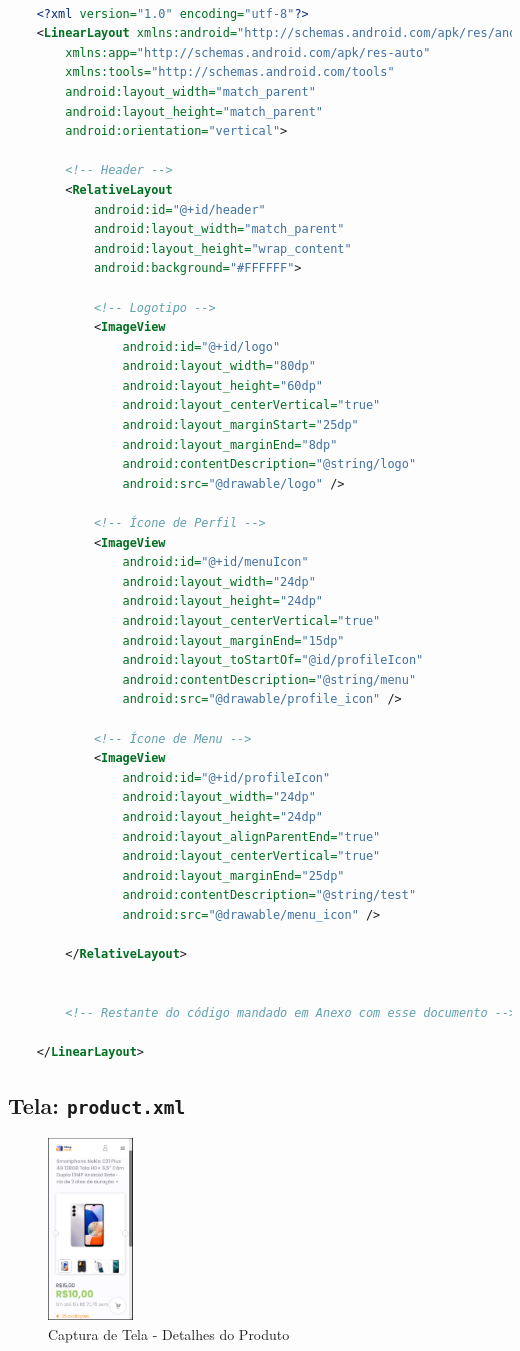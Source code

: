 \documentclass[
	12pt,				%
	openright,			%
	twoside,			%
	a4paper,			%
	english,			%
	brazil				%
	]{abntex2}
\begin{document}
\begin{lstlisting}[language=XML, caption=ECódigo Layout Principal do portal, label=lst:xml]

	<?xml version="1.0" encoding="utf-8"?>
	<LinearLayout xmlns:android="http://schemas.android.com/apk/res/android"
		xmlns:app="http://schemas.android.com/apk/res-auto"
		xmlns:tools="http://schemas.android.com/tools"
		android:layout_width="match_parent"
		android:layout_height="match_parent"
		android:orientation="vertical">
	
		<!-- Header -->
		<RelativeLayout
			android:id="@+id/header"
			android:layout_width="match_parent"
			android:layout_height="wrap_content"
			android:background="#FFFFFF">
	
			<!-- Logotipo -->
			<ImageView
				android:id="@+id/logo"
				android:layout_width="80dp"
				android:layout_height="60dp"
				android:layout_centerVertical="true"
				android:layout_marginStart="25dp"
				android:layout_marginEnd="8dp"
				android:contentDescription="@string/logo"
				android:src="@drawable/logo" />
	
			<!-- Ícone de Perfil -->
			<ImageView
				android:id="@+id/menuIcon"
				android:layout_width="24dp"
				android:layout_height="24dp"
				android:layout_centerVertical="true"
				android:layout_marginEnd="15dp"
				android:layout_toStartOf="@id/profileIcon"
				android:contentDescription="@string/menu"
				android:src="@drawable/profile_icon" />
	
			<!-- Ícone de Menu -->
			<ImageView
				android:id="@+id/profileIcon"
				android:layout_width="24dp"
				android:layout_height="24dp"
				android:layout_alignParentEnd="true"
				android:layout_centerVertical="true"
				android:layout_marginEnd="25dp"
				android:contentDescription="@string/test"
				android:src="@drawable/menu_icon" />
	
		</RelativeLayout>
	
	
		<!-- Restante do código mandado em Anexo com esse documento -->
	
	</LinearLayout>

\end{lstlisting}

\subsection{Tela: \texttt{product.xml}}

\begin{figure}[htb]
    \centering
    \includegraphics[width=0.2\textwidth]{img/product}
    \caption{Captura de Tela - Detalhes do Produto}
\end{figure}
\end{document}
